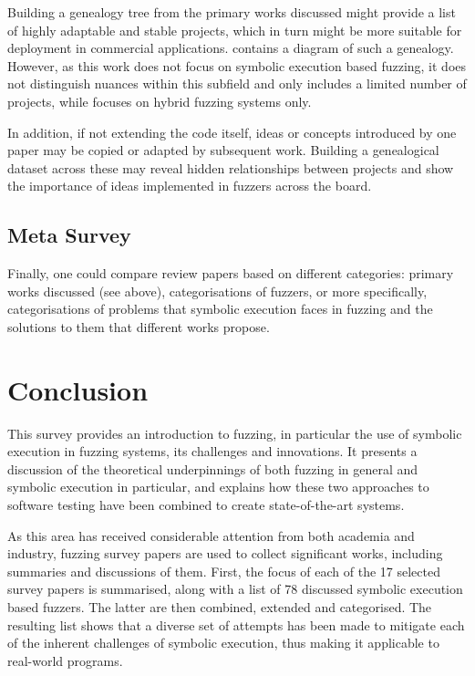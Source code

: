 \documentclass{article}
\begin{document}
\begin{multicols}{2}
    Building a genealogy tree from the primary works discussed might provide a list of highly adaptable and stable projects, which in turn might be more suitable for deployment in commercial applications. \cite{ArtScienceEng} contains a diagram of such a genealogy. However, as this work does not focus on symbolic execution based fuzzing, it does not distinguish nuances within this subfield and only includes a limited number of projects, while \cite{Hybrid} focuses on hybrid fuzzing systems only.

    In addition, if not extending the code itself, ideas or concepts introduced by one paper may be copied or adapted by subsequent work. Building a genealogical dataset across these may reveal hidden relationships between projects and show the importance of ideas implemented in fuzzers across the board.

    \subsection{Meta Survey}
    Finally, one could compare review papers based on different categories: primary works discussed (see above), categorisations of fuzzers, or more specifically, categorisations of problems that symbolic execution faces in fuzzing and the solutions to them that different works propose.
    \section{Conclusion}

    \label{Conclusion}
    This survey provides an introduction to fuzzing, in particular the use of symbolic execution in fuzzing systems, its challenges and innovations. It presents a discussion of the theoretical underpinnings of both fuzzing in general and symbolic execution in particular, and explains how these two approaches to software testing have been combined to create state-of-the-art systems.

    As this area has received considerable attention from both academia and industry, fuzzing survey papers are used to collect significant works, including summaries and discussions of them. First, the focus of each of the 17 selected survey papers is summarised, along with a list of 78 discussed symbolic execution based fuzzers. The latter are then combined, extended and categorised. The resulting list shows that a diverse set of attempts has been made to mitigate each of the inherent challenges of symbolic execution, thus making it applicable to real-world programs.


\end{multicols}
\end{document}
